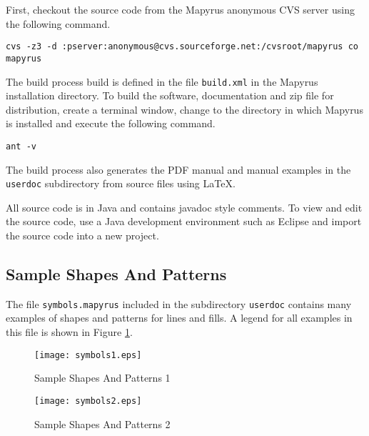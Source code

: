 First, checkout the source code from the Mapyrus anonymous CVS server
using the following command.

\begin{verbatim}
cvs -z3 -d :pserver:anonymous@cvs.sourceforge.net:/cvsroot/mapyrus co mapyrus
\end{verbatim}

The build process build is defined in the file \texttt{build.xml} in the
Mapyrus installation directory.  To build the software, documentation and zip
file for distribution, create a terminal window, change to the directory in
which Mapyrus is installed and execute the following command.

\begin{verbatim}
ant -v
\end{verbatim}

The build process also generates the PDF manual and manual examples in the
\texttt{userdoc} subdirectory from source files using \LaTeX.

All source code is in Java and contains javadoc style comments.  To view and
edit the source code, use a Java development environment such as Eclipse and
import the source code into a new project.


\subsection{Sample Shapes And Patterns}
The file \texttt{symbols.mapyrus} included in the subdirectory
\texttt{userdoc} contains many examples of shapes and patterns
for lines and fills.  A legend for all examples in this file is shown
in Figure \ref{samplesymbols}.

\begin{figure}[htb]
\label{samplesymbols}
\texttt{[image: symbols1.eps]}
\caption{Sample Shapes And Patterns 1}
\end{figure}

\begin{figure}[htb]
\texttt{[image: symbols2.eps]}
\caption{Sample Shapes And Patterns 2}
\end{figure}

